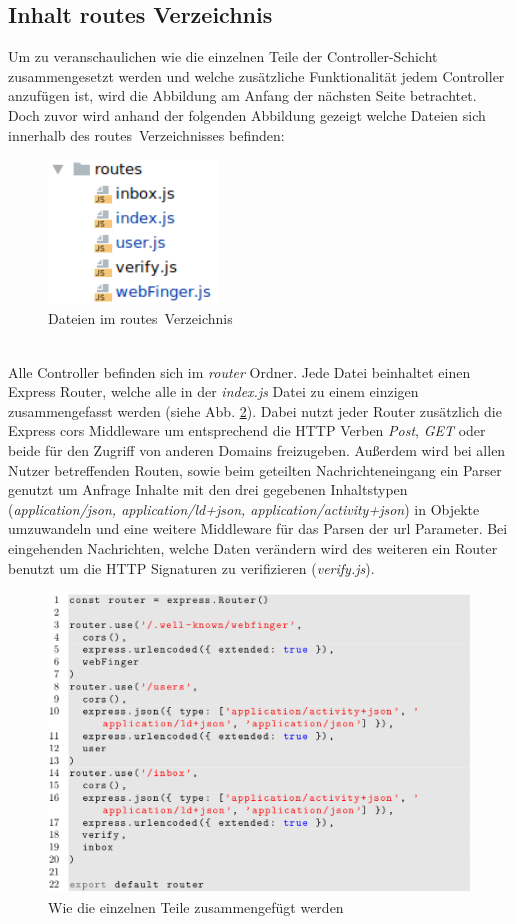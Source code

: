 \subsection{Inhalt routes Verzeichnis}
Um zu veranschaulichen wie die einzelnen Teile der Controller-Schicht zusammengesetzt werden und welche zusätzliche Funktionalität jedem Controller anzufügen ist, wird die Abbildung am Anfang der nächsten Seite betrachtet. Doch zuvor wird anhand der folgenden Abbildung gezeigt welche Dateien sich innerhalb des \glqq routes\grqq~Verzeichnisses befinden:
\begin{figure}[h]
	\centering
	\includegraphics[width=4.5cm]{figures/routes.png}
	\caption{Dateien im \glqq routes\grqq~Verzeichnis}
	\label{fig:router}
\end{figure}\\
Alle Controller befinden sich im  \textit{router} Ordner. Jede Datei beinhaltet einen Express Router, welche alle in der \textit{index.js} Datei zu einem einzigen zusammengefasst werden (siehe Abb. \ref{fig:router-index}). Dabei nutzt jeder Router zusätzlich die Express \gls{cors} Middleware um entsprechend die HTTP Verben \textit{Post}, \textit{GET} oder beide für den Zugriff von anderen Domains freizugeben. Außerdem wird bei allen Nutzer betreffenden Routen, sowie beim geteilten Nachrichteneingang ein Parser genutzt um Anfrage Inhalte mit den drei gegebenen Inhaltstypen (\textit{application/json, application/ld+json, application/activity+json}) in Objekte umzuwandeln und eine weitere Middleware für das Parsen der \gls{url} Parameter. Bei eingehenden Nachrichten, welche Daten verändern wird des weiteren ein Router benutzt um die HTTP Signaturen zu verifizieren (\textit{verify.js}).
\begin{figure}[h]
	\centering
	\includegraphics[width=15cm]{figures/router-index.png}
	\caption{Wie die einzelnen Teile zusammengefügt werden}
	\label{fig:router-index}
\end{figure}
